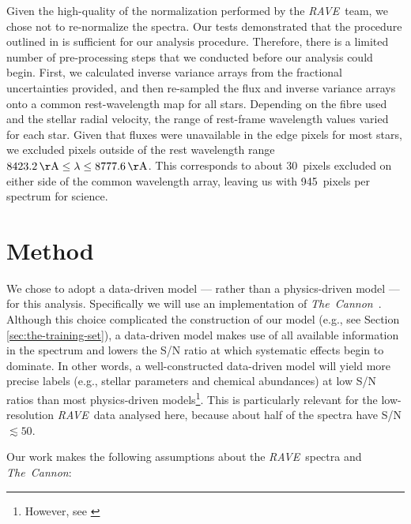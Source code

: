 \documentclass[preprint,trackchanges]{aastex}
\newcommand{\acronym}[1]{{\small{#1}}}
\newcommand{\project}[1]{\textsl{#1}}
\newcommand{\thecannon}{\project{The~Cannon}}
\newcommand{\rave}{\project{\acronym{RAVE}}}
\begin{document}
Given the high-quality of the normalization performed by the \rave\ team, we chose
not to re-normalize the spectra.  Our tests demonstrated that the procedure 
outlined in \citet{Kunder_2016} is sufficient for our analysis procedure. Therefore,
there is a limited number of pre-processing steps that we conducted before our
analysis could begin.  First, we calculated inverse variance arrays from the
fractional uncertainties provided, and then re-sampled the flux and inverse variance
arrays onto a common rest-wavelength map for all stars.  Depending on the fibre 
used and the stellar radial velocity, the range of rest-frame wavelength values
varied for each star.  Given that fluxes were unavailable in the edge pixels for 
most stars, we excluded pixels outside of the rest wavelength range 
$8423.2\,{\rm \AA} \le \lambda \le 8777.6\,{\rm \AA}$.  This corresponds to about
30~pixels excluded on either side of the common wavelength array, leaving us with
945~pixels per spectrum for science.


\section{Method}
\label{sec:method}

We chose to adopt a data-driven model --- rather than a physics-driven model ---
for this analysis.  Specifically we will use an implementation of \thecannon\
\citep{Ness_2015,Ness_2016}.  Although this choice complicated the construction 
of our model (e.g., see Section \ref{sec:the-training-set}), a data-driven model 
makes use of all available information in the spectrum and lowers the S/N ratio 
at which systematic effects begin to dominate.  In other words, a well-constructed
data-driven model will yield more precise labels (e.g., stellar parameters and
chemical abundances) at low S/N ratios than most physics-driven models\footnote{
However, see \citet{Casey_2016a}}.  This is particularly relevant for the 
low-resolution \rave\ data analysed here, because about half of the spectra have
S/N $\lesssim 50$.  


\noindent{}Our work makes the following assumptions about the \rave\ spectra and \thecannon:
\end{document}
